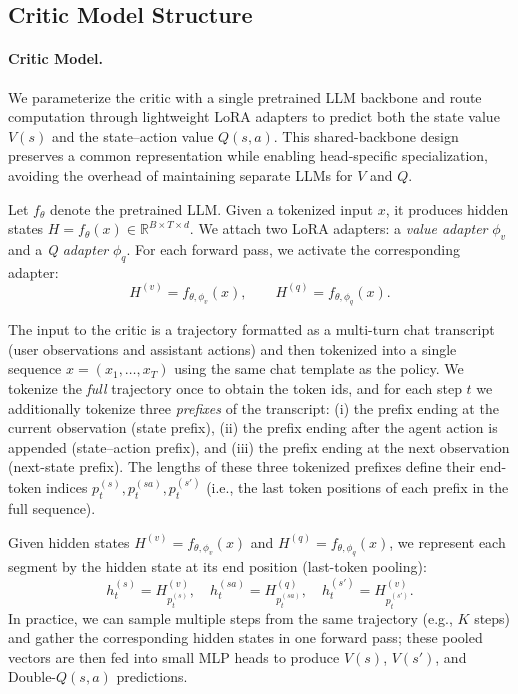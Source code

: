\subsection{Critic Model Structure}

\label{sec:critic}
\paragraph{Critic Model.}
We parameterize the critic with a single pretrained LLM backbone and route computation through lightweight LoRA adapters to predict both the state value $V(s)$ and the state--action value $Q(s,a)$. This shared-backbone design preserves a common representation while enabling head-specific specialization, avoiding the overhead of maintaining separate LLMs for $V$ and $Q$.

Let $f_\theta$ denote the pretrained LLM. Given a tokenized input $x$, it produces hidden states
$H = f_\theta(x)\in\mathbb{R}^{B\times T\times d}$.
We attach two LoRA adapters: a \emph{value adapter} $\phi_v$ and a \emph{Q adapter} $\phi_q$.
For each forward pass, we activate the corresponding adapter:
\begin{equation}
H^{(v)} = f_{\theta,\phi_v}(x), \qquad
H^{(q)} = f_{\theta,\phi_q}(x).
\label{eq:adapter-routing}
\end{equation}


The input to the critic is a trajectory formatted as a multi-turn chat transcript (user observations and assistant actions) and then tokenized into a single sequence $x=(x_1,\dots,x_T)$ using the same chat template as the policy.
We tokenize the \emph{full} trajectory once to obtain the token ids, and for each step $t$ we additionally tokenize three \emph{prefixes} of the transcript: (i) the prefix ending at the current observation (state prefix), (ii) the prefix ending after the agent action is appended (state--action prefix), and (iii) the prefix ending at the next observation (next-state prefix).
The lengths of these three tokenized prefixes define their end-token indices $p_t^{(s)}, p_t^{(sa)}, p_t^{(s')}$ (i.e., the last token positions of each prefix in the full sequence).

Given hidden states $H^{(v)}=f_{\theta,\phi_v}(x)$ and $H^{(q)}=f_{\theta,\phi_q}(x)$, we represent each segment by the hidden state at its end position (last-token pooling):
\[
h_t^{(s)} = H^{(v)}_{p_t^{(s)}}, \quad
h_t^{(sa)} = H^{(q)}_{p_t^{(sa)}}, \quad
h_t^{(s')} = H^{(v)}_{p_t^{(s')}}.
\]
In practice, we can sample multiple steps from the same trajectory (e.g., $K$ steps) and gather the corresponding hidden states in one forward pass; these pooled vectors are then fed into small MLP heads to produce $V(s)$, $V(s')$, and Double-$Q(s,a)$ predictions.

